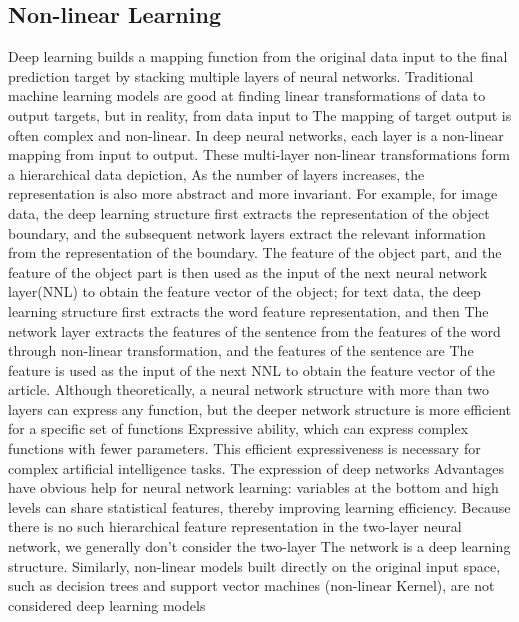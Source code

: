 \documentclass[11pt,en]{elegantpaper}
\begin{document}
\subsection{Non-linear Learning}
Deep learning builds a mapping function from the original data input to the final prediction target by stacking multiple layers of neural networks. Traditional machine learning models are good at finding linear transformations of data to output targets, but in reality, from data input to The mapping of target output is often complex and non-linear. In deep neural networks, each layer is a non-linear mapping from input to output. These multi-layer non-linear transformations form a hierarchical data depiction, As the number of layers increases, the representation is also more abstract and more invariant. For example, for image data, the deep learning structure first extracts the representation of the object boundary, and the subsequent network layers extract the relevant information from the representation of the boundary. The feature of the object part, and the feature of the object part is then used as the input of the next neural network layer(NNL) to obtain the feature vector of the object\cite{32}; for text data, the deep learning structure first extracts the word feature representation, and then The network layer extracts the features of the sentence from the features of the word through non-linear transformation, and the features of the sentence are The feature is used as the input of the next NNL to obtain the feature vector of the article. Although theoretically, a neural network structure with more than two layers can express any function, but the deeper network structure is more efficient for a specific set of functions Expressive ability, which can express complex functions with fewer parameters\cite{33}. This efficient expressiveness is necessary for complex artificial intelligence tasks. The expression of deep networks Advantages have obvious help for neural network learning: variables at the bottom and high levels can share statistical features, thereby improving learning efficiency. Because there is no such hierarchical feature representation in the two-layer neural network, we generally don't consider the two-layer The network is a deep learning structure. Similarly, non-linear models built directly on the original input space, such as decision trees and support vector machines (non-linear Kernel), are not considered deep learning models\cite{36}
\end{document}
